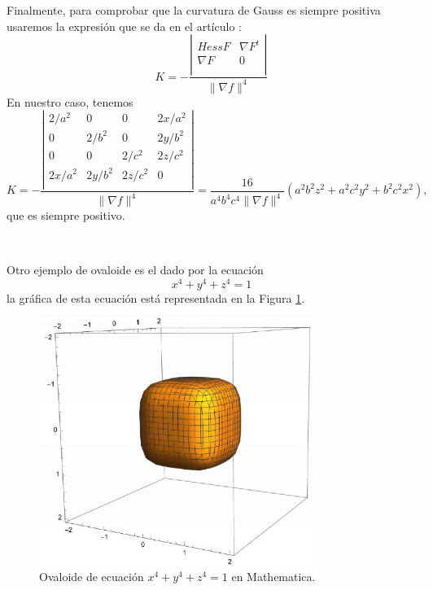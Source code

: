 \begin{definicion}
\begin{ejemplo}
	
	Finalmente, para comprobar que la curvatura de Gauss es siempre positiva usaremos la expresión que se da en el artículo \cite{RonGoldman}:
	$$
		K = - \frac{ \left| {\begin{array}{cc}
				Hess F & \nabla F^t \\ 
				\nabla F & 0 \\
				\end{array} } \right| }{\| \nabla f \|^4}		 
	$$
	En nuestro caso, tenemos
	\[
		K = - \frac{ \left| {\begin{array}{cccc}
				2/a^2 & 0 & 0 & 2x/a^2 \\ 
				0 & 2/b^2 & 0 & 2y/b^2 \\ 
				0 & 0 & 2/c^2 & 2z/c^2 \\ 
				2x/a^2 & 2y/b^2 & 2z/c^2 & 0 \\
				\end{array} } \right| }{\| \nabla f \|^4}
		= \frac{16}{a^4b^4c^4 \| \nabla f \|^4}(a^2 b^2 z^2+a^2c^2y^2+b^2c^2x^2),
	\]
	que es siempre positivo.
\end{ejemplo}
${ }$\\

\begin{ejemplo}
	Otro ejemplo de ovaloide es el dado por la ecuación $$ x^4 + y^4 + z^4 = 1 $$ la gráfica de esta ecuación está representada en la Figura \ref{fig:etiq_11}.
		\begin{figure}[ht]
			\begin{center}
				\includegraphics[width=0.8\textwidth]{imagenes/ovaloide2.png}
			\end{center}
			\caption{Ovaloide de ecuación $x^4 + y^4 + z^4 = 1$ en Mathematica.}
			\label{fig:etiq_11}
		\end{figure}
\end{ejemplo}
${ }$\\


\end{definicion}
